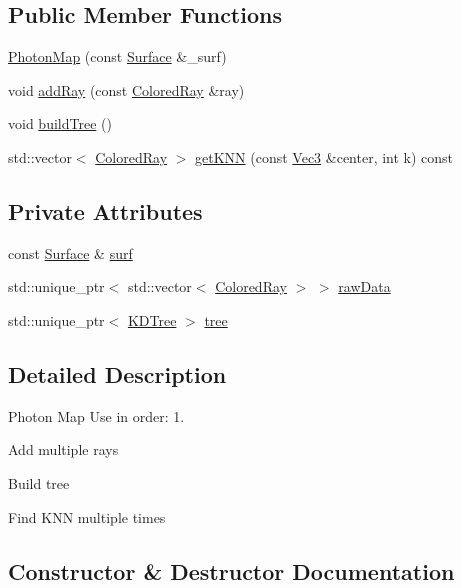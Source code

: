 \subsection*{Public Member Functions}
\begin{DoxyCompactItemize}
\item 
\hyperlink{classPhotonMap_ac493f8c1f27901b6a3d5703097379332}{Photon\+Map} (const \hyperlink{classSurface}{Surface} \&\+\_\+surf)
\item 
void \hyperlink{classPhotonMap_a48205afd792b0339ed4639f2028a3145}{add\+Ray} (const \hyperlink{structColoredRay}{Colored\+Ray} \&ray)
\item 
void \hyperlink{classPhotonMap_a0a190c6a8b5dbddc76a369d022685481}{build\+Tree} ()
\item 
std\+::vector$<$ \hyperlink{structColoredRay}{Colored\+Ray} $>$ \hyperlink{classPhotonMap_a435d846181e4deed73481e49e8508c07}{get\+K\+NN} (const \hyperlink{vec_8h_ae4fcaa7c0a3935930ed1be5f70b90373}{Vec3} \&center, int k) const 
\end{DoxyCompactItemize}
\subsection*{Private Attributes}
\begin{DoxyCompactItemize}
\item 
const \hyperlink{classSurface}{Surface} \& \hyperlink{classPhotonMap_a347cfa86f86fd505194780438f1fb1d8}{surf}
\item 
std\+::unique\+\_\+ptr$<$ std\+::vector$<$ \hyperlink{structColoredRay}{Colored\+Ray} $>$ $>$ \hyperlink{classPhotonMap_a20419eecb0781c24cbda8210bc0df221}{raw\+Data}
\item 
std\+::unique\+\_\+ptr$<$ \hyperlink{classKDTree}{K\+D\+Tree} $>$ \hyperlink{classPhotonMap_aab0b914c435f74e2ce85fab273d94030}{tree}
\end{DoxyCompactItemize}


\subsection{Detailed Description}
Photon Map Use in order\+: 1. 

Add multiple rays
\begin{DoxyEnumerate}
\item Build tree
\item Find K\+NN multiple times 
\end{DoxyEnumerate}

\subsection{Constructor \& Destructor Documentation}
